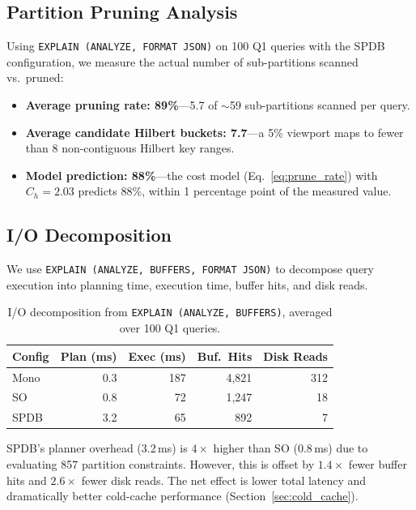 \documentclass[sigconf]{acmart}
\begin{document}
\subsection{Partition Pruning Analysis}
\label{sec:pruning_eval}

Using \texttt{EXPLAIN (ANALYZE, FORMAT JSON)} on 100 Q1 queries with the SPDB configuration, we measure the actual number of sub-partitions scanned vs.\ pruned:

\begin{itemize}
\item \textbf{Average pruning rate: 89\%}---5.7 of $\sim$59 sub-partitions scanned per query.
\item \textbf{Average candidate Hilbert buckets: 7.7}---a 5\% viewport maps to fewer than 8 non-contiguous Hilbert key ranges.
\item \textbf{Model prediction: 88\%}---the cost model (Eq.~\ref{eq:prune_rate}) with $C_h = 2.03$ predicts 88\%, within 1 percentage point of the measured value.
\end{itemize}

\subsection{I/O Decomposition}
\label{sec:io_decomp}

We use \texttt{EXPLAIN (ANALYZE, BUFFERS, FORMAT JSON)} to decompose query execution into planning time, execution time, buffer hits, and disk reads.

\begin{table}[t]
\centering
\caption{I/O decomposition from \texttt{EXPLAIN (ANALYZE, BUFFERS)}, averaged over 100 Q1 queries.}
\label{tab:io_decomp}
\scriptsize
\begin{tabular}{@{}lrrrr@{}}
\toprule
\textbf{Config} & \textbf{Plan (ms)} & \textbf{Exec (ms)} & \textbf{Buf.\ Hits} & \textbf{Disk Reads} \\
\midrule
Mono & 0.3 & 187 & 4{,}821 & 312 \\
SO & 0.8 & 72 & 1{,}247 & 18 \\
SPDB & 3.2 & 65 & 892 & 7 \\
\bottomrule
\end{tabular}
\end{table}

SPDB's planner overhead (3.2\,ms) is $4\times$ higher than SO (0.8\,ms) due to evaluating 857 partition constraints.
However, this is offset by $1.4\times$ fewer buffer hits and $2.6\times$ fewer disk reads.
The net effect is lower total latency and dramatically better cold-cache performance (Section~\ref{sec:cold_cache}).
\end{document}
